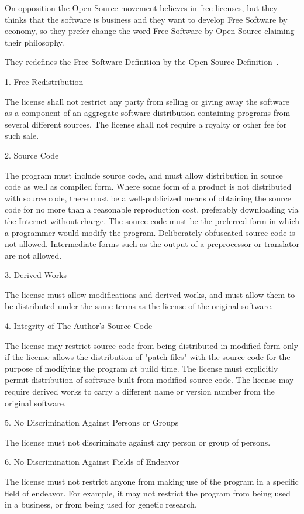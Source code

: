 \documentclass[fleqn,10pt,lineno]{wlpeerj} %
\begin{document}
On opposition the Open Source movement believes in free licenses, but
they thinks that the software is business and they want to develop
Free Software by economy, so they prefer change the word Free Software
by Open Source claiming their philosophy.

They redefines the Free Software Definition by the Open Source
Definition~\cite{perens1999open}.

1. Free Redistribution

The license shall not restrict any party from selling or giving away
the software as a component of an aggregate software distribution
containing programs from several different sources. The license shall
not require a royalty or other fee for such sale.

2. Source Code

The program must include source code, and must allow distribution in
source code as well as compiled form. Where some form of a product is
not distributed with source code, there must be a well-publicized
means of obtaining the source code for no more than a reasonable
reproduction cost, preferably downloading via the Internet without
charge. The source code must be the preferred form in which a
programmer would modify the program. Deliberately obfuscated source
code is not allowed. Intermediate forms such as the output of a
preprocessor or translator are not allowed.

3. Derived Works

The license must allow modifications and derived works, and must allow
them to be distributed under the same terms as the license of the
original software.

4. Integrity of The Author's Source Code

The license may restrict source-code from being distributed in
modified form only if the license allows the distribution of "patch
files" with the source code for the purpose of modifying the program
at build time. The license must explicitly permit distribution of
software built from modified source code. The license may require
derived works to carry a different name or version number from the
original software.

5. No Discrimination Against Persons or Groups

The license must not discriminate against any person or group of
persons.

6. No Discrimination Against Fields of Endeavor

The license must not restrict anyone from making use of the program in
a specific field of endeavor. For example, it may not restrict the
program from being used in a business, or from being used for genetic
research.
\end{document}
